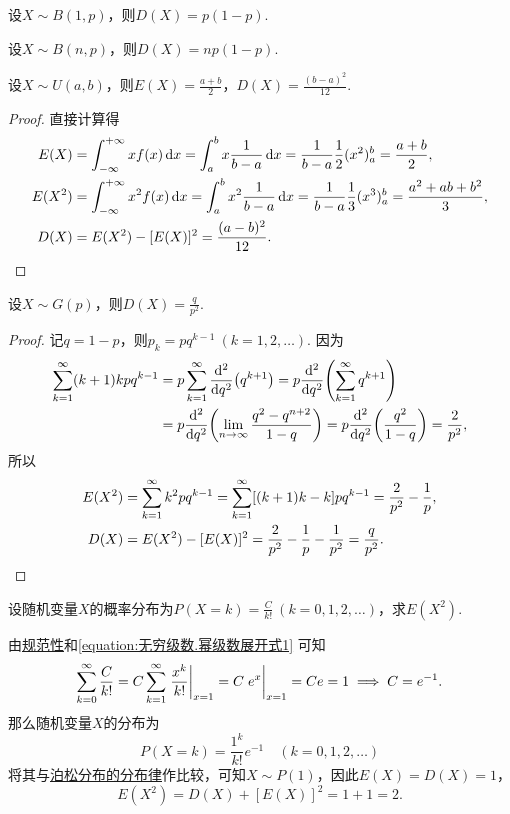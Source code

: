 \begin{theorem}
设\(X \sim B(1,p)\)，则\(D(X) = p(1-p)\).
\end{theorem}

\begin{theorem}
设\(X \sim B(n,p)\)，则\(D(X) = np(1-p)\).
\end{theorem}

\begin{theorem}
设\(X \sim U(a,b)\)，则\(E(X) = \frac{a+b}{2}\)，\(D(X) = \frac{(b-a)^2}{12}\).
\begin{proof}
直接计算得
\begin{align*}
E(X) &= \int_{-\infty}^{+\infty} x f(x) \dd{x}
= \int_a^b x \frac{1}{b-a} \dd{x}
= \frac{1}{b-a} \frac{1}{2} (x^2)_a^b
= \frac{a+b}{2}, \\
E(X^2) &= \int_{-\infty}^{+\infty} x^2 f(x) \dd{x}
= \int_a^b x^2 \frac{1}{b-a} \dd{x}
= \frac{1}{b-a} \frac{1}{3} (x^3)_a^b
= \frac{a^2+ab+b^2}{3}, \\
D(X) &= E(X^2) - [E(X)]^2
= \frac{(a-b)^2}{12}.
\qedhere
\end{align*}
\end{proof}
\end{theorem}

\begin{theorem}\label{theorem:随机变量的数字特征.几何分布的方差}
设\(X \sim G(p)\)，则\(D(X) = \frac{q}{p^2}\).
\begin{proof}
记\(q = 1-p\)，则\(p_k = pq^{k-1}\ (k=1,2,\dotsc)\).
因为\begin{align*}
	\sum_{k=1}^\infty (k+1)kpq^{k-1}
	&= p \sum_{k=1}^\infty \dv[2]{q}(q^{k+1})
	= p \dv[2]{q}(\sum_{k=1}^\infty q^{k+1}) \\
	&= p \dv[2]{q}(\lim_{n\to\infty} \frac{q^2-q^{n+2}}{1-q})
	= p \dv[2]{q}(\frac{q^2}{1-q})
	= \frac{2}{p^2}, \\
\end{align*}
所以\begin{align*}
	E(X^2) &= \sum_{k=1}^\infty k^2 pq^{k-1}
	= \sum_{k=1}^\infty [(k+1)k-k] pq^{k-1}
	= \frac{2}{p^2} - \frac{1}{p}, \\
	D(X) &= E(X^2) - [E(X)]^2
	= \frac{2}{p^2} - \frac{1}{p} - \frac{1}{p^2}
	= \frac{q}{p^2}.
	\qedhere
\end{align*}
\end{proof}
\end{theorem}

\begin{example}
设随机变量\(X\)的概率分布为\(P(X=k) = \frac{C}{k!}\ (k=0,1,2,\dotsc)\)，求\(E(X^2)\).
\begin{solution}
由\hyperref[theorem:随机变量及其分布.离散型随机变量的密度函数的性质]{规范性}和\cref{equation:无穷级数.幂级数展开式1} 可知\[
\sum_{k=0}^\infty \frac{C}{k!}
= C \sum_{k=1}^\infty \eval{\frac{x^k}{k!}}_{x=1}
= C \eval{e^x}_{x=1}
= C e = 1
\implies
C = e^{-1}.
\]那么随机变量\(X\)的分布为\[
P(X=k) = \frac{1^k}{k!} e^{-1} \quad(k=0,1,2,\dotsc)
\]将其与\hyperref[equation:随机变量及其分布.泊松分布的分布律]{泊松分布的分布律}作比较，可知\(X \sim P(1)\)，因此\(E(X) = D(X) = 1\)，\[
E(X^2) = D(X) + [E(X)]^2 = 1 + 1 = 2.
\]
\end{solution}
\end{example}

